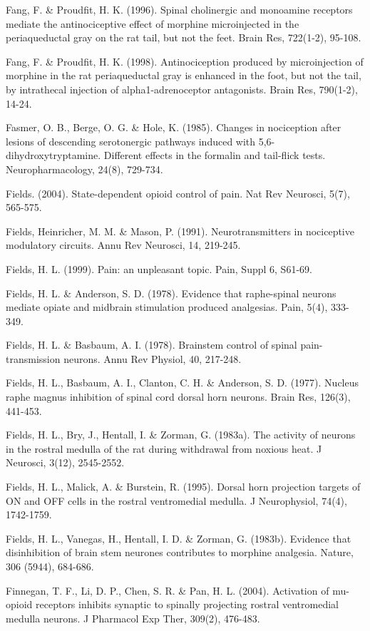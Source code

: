 \documentclass[a4paper,12pt,twoside]{report}
\begin{document}
\begin{singlespacing}
\begin{footnotesize}
Fang, F. \& Proudfit, H. K. (1996). Spinal cholinergic and monoamine receptors mediate the antinociceptive effect of morphine microinjected in the periaqueductal gray on the rat tail, but not the feet. Brain Res, 722(1-2), 95-108.

Fang, F. \& Proudfit, H. K. (1998). Antinociception produced by microinjection of morphine in the rat periaqueductal gray is enhanced in the foot, but not the tail, by intrathecal injection of alpha1-adrenoceptor antagonists. Brain Res, 790(1-2), 14-24.

Fasmer, O. B., Berge, O. G. \& Hole, K. (1985). Changes in nociception after lesions of descending serotonergic pathways induced with 5,6-dihydroxytryptamine. Different effects in the formalin and tail-flick tests. Neuropharmacology, 24(8), 729-734.

Fields. (2004). State-dependent opioid control of pain. Nat Rev Neurosci, 5(7), 565-575.

Fields, Heinricher, M. M. \& Mason, P. (1991). Neurotransmitters in nociceptive modulatory circuits. Annu Rev Neurosci, 14, 219-245.

Fields, H. L. (1999). Pain: an unpleasant topic. Pain, Suppl 6, S61-69.

Fields, H. L. \& Anderson, S. D. (1978). Evidence that raphe-spinal neurons mediate opiate and midbrain stimulation produced analgesias. Pain, 5(4), 333-349.

Fields, H. L. \& Basbaum, A. I. (1978). Brainstem control of spinal pain-transmission neurons. Annu Rev Physiol, 40, 217-248.

Fields, H. L., Basbaum, A. I., Clanton, C. H. \& Anderson, S. D. (1977). Nucleus raphe magnus inhibition of spinal cord dorsal horn neurons. Brain Res, 126(3), 441-453.

Fields, H. L., Bry, J., Hentall, I. \& Zorman, G. (1983a). The activity of neurons in the rostral medulla of the rat during withdrawal from noxious heat. J Neurosci, 3(12), 2545-2552.

Fields, H. L., Malick, A. \& Burstein, R. (1995). Dorsal horn projection targets of ON and OFF cells in the rostral ventromedial medulla. J Neurophysiol, 74(4), 1742-1759.

Fields, H. L., Vanegas, H., Hentall, I. D. \& Zorman, G. (1983b). Evidence that disinhibition of brain stem neurones contributes to morphine analgesia. Nature, 306 (5944), 684-686.

Finnegan, T. F., Li, D. P., Chen, S. R. \& Pan, H. L. (2004). Activation of mu-opioid receptors inhibits synaptic to spinally projecting rostral ventromedial medulla neurons. J Pharmacol Exp Ther, 309(2), 476-483.


\end{footnotesize}
\end{singlespacing}
\end{document}
